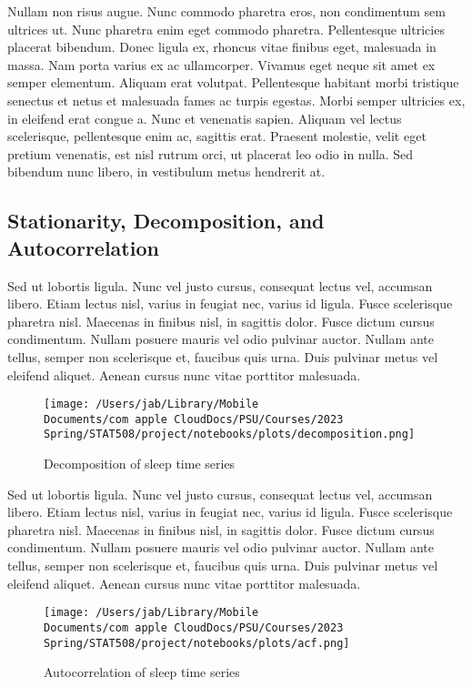 \documentclass{article}
\begin{document}
Nullam non risus augue. Nunc commodo pharetra eros, non condimentum sem
ultrices ut. Nunc pharetra enim eget commodo pharetra. Pellentesque
ultricies placerat bibendum. Donec ligula ex, rhoncus vitae finibus
eget, malesuada in massa. Nam porta varius ex ac ullamcorper. Vivamus
eget neque sit amet ex semper elementum. Aliquam erat volutpat.
Pellentesque habitant morbi tristique senectus et netus et malesuada
fames ac turpis egestas. Morbi semper ultricies ex, in eleifend erat
congue a. Nunc et venenatis sapien. Aliquam vel lectus scelerisque,
pellentesque enim ac, sagittis erat. Praesent molestie, velit eget
pretium venenatis, est nisl rutrum orci, ut placerat leo odio in nulla.
Sed bibendum nunc libero, in vestibulum metus hendrerit at.

\hypertarget{stationarity-decomposition-and-autocorrelation}{%
\subsection{Stationarity, Decomposition, and
Autocorrelation}\label{stationarity-decomposition-and-autocorrelation}}

Sed ut lobortis ligula. Nunc vel justo cursus, consequat lectus vel,
accumsan libero. Etiam lectus nisl, varius in feugiat nec, varius id
ligula. Fusce scelerisque pharetra nisl. Maecenas in finibus nisl, in
sagittis dolor. Fusce dictum cursus condimentum. Nullam posuere mauris
vel odio pulvinar auctor. Nullam ante tellus, semper non scelerisque et,
faucibus quis urna. Duis pulvinar metus vel eleifend aliquet. Aenean
cursus nunc vitae porttitor malesuada.

\begin{figure}
\centering
  \texttt{[image: /Users/jab/Library/Mobile Documents/com~apple~CloudDocs/PSU/Courses/2023 Spring/STAT508/project/notebooks/plots/decomposition.png]}
\caption{Decomposition of sleep time series}
\end{figure}

Sed ut lobortis ligula. Nunc vel justo cursus, consequat lectus vel,
accumsan libero. Etiam lectus nisl, varius in feugiat nec, varius id
ligula. Fusce scelerisque pharetra nisl. Maecenas in finibus nisl, in
sagittis dolor. Fusce dictum cursus condimentum. Nullam posuere mauris
vel odio pulvinar auctor. Nullam ante tellus, semper non scelerisque et,
faucibus quis urna. Duis pulvinar metus vel eleifend aliquet. Aenean
cursus nunc vitae porttitor malesuada.

\begin{figure}
\centering
  \texttt{[image: /Users/jab/Library/Mobile Documents/com~apple~CloudDocs/PSU/Courses/2023 Spring/STAT508/project/notebooks/plots/acf.png]}
\caption{Autocorrelation of sleep time series}
\end{figure}
\end{document}
